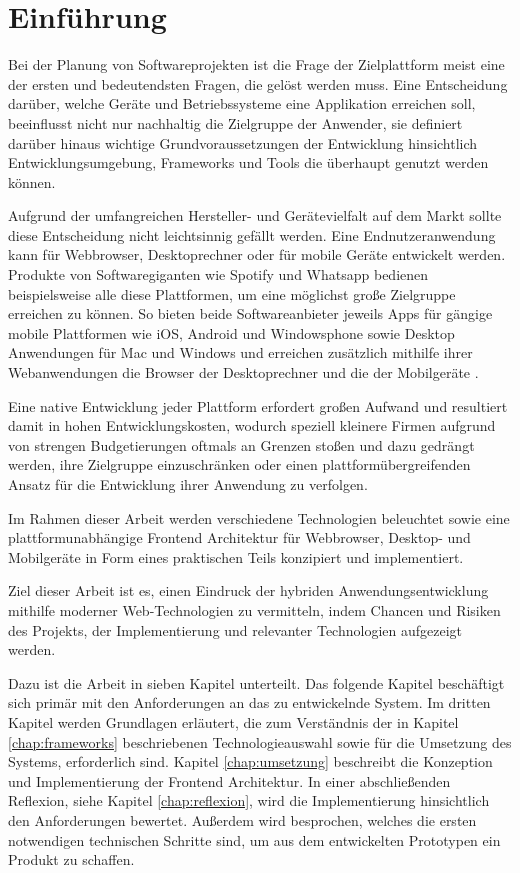 
\chapter{Einführung}
\label{chap:introduction}

Bei der Planung von Softwareprojekten ist die Frage der Zielplattform meist eine der ersten und bedeutendsten Fragen,
die gelöst werden muss. Eine Entscheidung darüber, welche Geräte und Betriebssysteme eine Applikation erreichen soll,
beeinflusst nicht nur nachhaltig die Zielgruppe der Anwender, sie definiert darüber hinaus wichtige Grundvoraussetzungen der Entwicklung hinsichtlich Entwicklungsumgebung, Frameworks und Tools die überhaupt genutzt werden können.

Aufgrund der umfangreichen Hersteller- und Gerätevielfalt auf dem Markt sollte diese Entscheidung nicht leichtsinnig gefällt werden.
Eine Endnutzeranwendung kann für Webbrowser, Desktoprechner oder für mobile Geräte entwickelt werden.
Produkte von Softwaregiganten wie Spotify und Whatsapp bedienen beispielsweise alle diese Plattformen, um eine möglichst große Zielgruppe erreichen zu können.
So bieten beide Softwareanbieter jeweils Apps für gängige mobile Plattformen wie iOS, Android und Windowsphone
sowie Desktop Anwendungen für Mac und Windows und erreichen zusätzlich mithilfe ihrer Webanwendungen die Browser der Desktoprechner
und die der Mobilgeräte \cite{Spoti93:online} \cite{Whats74:online} \cite{Whats6:online}.

Eine native Entwicklung jeder Plattform erfordert großen Aufwand und resultiert damit in hohen
Entwicklungskosten, wodurch speziell kleinere Firmen aufgrund von strengen Budgetierungen oftmals
an Grenzen stoßen und
dazu gedrängt werden, ihre Zielgruppe einzuschränken oder einen plattformübergreifenden Ansatz für
die Entwicklung ihrer Anwendung zu verfolgen.

Im Rahmen dieser Arbeit werden verschiedene Technologien beleuchtet sowie eine
plattformunabhängige Frontend Architektur für Webbrowser, Desktop- und Mobilgeräte in Form eines praktischen Teils
konzipiert und implementiert.

Ziel dieser Arbeit ist es, einen Eindruck der hybriden Anwendungsentwicklung mithilfe moderner
Web-Technologien zu vermitteln, indem Chancen und Risiken des Projekts, der Implementierung und relevanter Technologien aufgezeigt werden.

\vspace{0.6cm}

\noindent
Dazu ist die Arbeit in sieben Kapitel unterteilt. Das folgende Kapitel beschäftigt sich primär mit den
Anforderungen an das zu entwickelnde System.
Im dritten Kapitel werden Grundlagen erläutert, die zum Verständnis der in Kapitel \ref{chap:frameworks} beschriebenen Technologieauswahl
sowie für die Umsetzung des Systems, erforderlich sind.
Kapitel \ref{chap:umsetzung} beschreibt die Konzeption und Implementierung der Frontend Architektur.
In einer abschließenden Reflexion, siehe Kapitel \ref{chap:reflexion}, wird die Implementierung hinsichtlich den Anforderungen bewertet.
Außerdem wird besprochen, welches die ersten notwendigen technischen Schritte sind, um aus dem entwickelten Prototypen ein Produkt zu schaffen.

